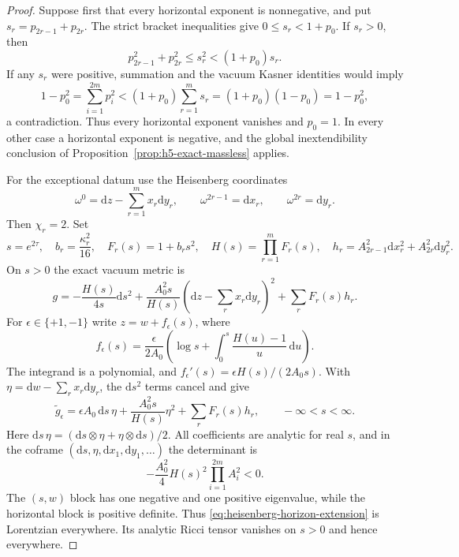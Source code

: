 \documentclass[10pt,a4paper]{article}
\numberwithin{equation}{section}
\theoremstyle{definition}
\theoremstyle{remark}
\newcommand{\dd}{\mathrm d}
\begin{document}
\begin{proof}
Suppose first that every horizontal exponent is nonnegative, and put
$s_r=p_{2r-1}+p_{2r}$.  The strict bracket inequalities give
$0\le s_r<1+p_0$.  If $s_r>0$, then
\[
 p_{2r-1}^2+p_{2r}^2\le s_r^2<(1+p_0)s_r.
\]
If any $s_r$ were positive, summation and the vacuum Kasner identities
would imply
\[
 1-p_0^2=\sum_{i=1}^{2m}p_i^2
 <(1+p_0)\sum_{r=1}^m s_r
 =(1+p_0)(1-p_0)=1-p_0^2,
\]
a contradiction.  Thus every horizontal exponent vanishes and $p_0=1$.
In every other case a horizontal exponent is negative, and the global
inextendibility conclusion of Proposition~\ref{prop:h5-exact-massless}
applies.

For the exceptional datum use the Heisenberg coordinates
\[
 \omega^0=\dd z-\sum_{r=1}^m x_r\dd y_r,
 \qquad \omega^{2r-1}=\dd x_r,\qquad
 \omega^{2r}=\dd y_r.
\]
Then $\chi_r=2$.  Set
\begin{equation}
 s=e^{2\tau},\quad b_r=\frac{\kappa_r^2}{16},\quad
 F_r(s)=1+b_rs^2,\quad H(s)=\prod_{r=1}^mF_r(s),\quad
 h_r=A_{2r-1}^2\dd x_r^2+A_{2r}^2\dd y_r^2.
 \label{eq:heisenberg-horizon-functions}
\end{equation}
On $s>0$ the exact vacuum metric is
\begin{equation}
 g=-\frac{H(s)}{4s}\dd s^2
   +\frac{A_0^2s}{H(s)}
      \left(\dd z-\sum_r x_r\dd y_r\right)^2
   +\sum_rF_r(s)h_r.
 \label{eq:heisenberg-exceptional-metric}
\end{equation}
For $\epsilon\in\{+1,-1\}$ write $z=w+f_\epsilon(s)$, where
\[
 f_\epsilon(s)=\frac{\epsilon}{2A_0}
 \left(\log s+\int_0^s\frac{H(u)-1}{u}\,\dd u\right).
\]
The integrand is a polynomial, and
$f_\epsilon'(s)=\epsilon H(s)/(2A_0s)$.
With $\eta=\dd w-\sum_r x_r\dd y_r$, the $\dd s^2$ terms cancel and give
\begin{equation}
 \widetilde g_\epsilon
   =\epsilon A_0\,\dd s\,\eta
    +\frac{A_0^2s}{H(s)}\eta^2
    +\sum_rF_r(s)h_r,
 \qquad -\infty<s<\infty.
 \label{eq:heisenberg-horizon-extension}
\end{equation}
Here $\dd s\,\eta=(\dd s\otimes\eta+\eta\otimes\dd s)/2$.
All coefficients are analytic for real $s$, and in the coframe
$(\dd s,\eta,\dd x_1,\dd y_1,\ldots)$ the determinant is
\[
 -\frac{A_0^2}{4}H(s)^2\prod_{i=1}^{2m}A_i^2<0.
\]
The $(s,w)$ block has one negative and one positive eigenvalue, while
the horizontal block is positive definite.  Thus
\eqref{eq:heisenberg-horizon-extension} is Lorentzian everywhere.
Its analytic Ricci tensor vanishes on $s>0$ and hence everywhere.


\end{proof}
\end{document}
